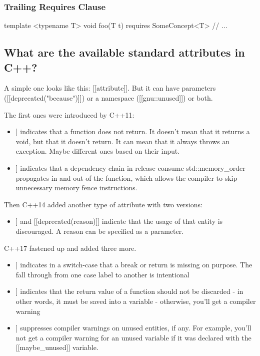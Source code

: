 \documentclass{report}
\begin{document}
\bigbreak \noindent 
\subsubsection{Trailing Requires Clause}
\bigbreak \noindent 
\begin{cppcode}
template <typename T>
void foo(T t) requires SomeConcept<T> {
    // ...
}
\end{cppcode}

\bigbreak \noindent 
\subsection{What are the available standard attributes in C++?}
\bigbreak \noindent 
A simple one looks like this: [[attribute]]. But it can have
parameters ([[deprecated("because")]]) or a namespace
([[gnu::unused]]) or both.

\bigbreak \noindent 
The first ones were introduced by C++11:
\begin{itemize}
    \item \relax [[noreturn]] indicates that a function does not return. It doesn’t mean that it returns a void, but that it doesn’t return. It can mean that it always throws an exception. Maybe different ones based on their input.
    \item  \relax [[carries\_dependency]] indicates that a dependency chain in release-consume std::memory\_order propagates in and out of the function, which allows the compiler to skip unnecessary memory fence instructions.
\end{itemize}

\bigbreak \noindent 
Then C++14 added another type of attribute with two versions:
\begin{itemize}
    \item \relax [[deprecated]] and [[deprecated(reason)]] indicate that the usage of that entity is discouraged. A reason can be specified as a parameter.
\end{itemize}
\bigbreak \noindent 
C++17 fastened up and added three more.
\begin{itemize}
    \item \relax [[fallthrough]] indicates in a switch-case that a break or return is missing on purpose. The fall through from one case label to another is intentional
    \item \relax [[nodiscard]] indicates that the return value of a function should not be discarded - in other words, it must be saved into a variable - otherwise, you’ll get a compiler warning
    \item \relax [[maybe\_unused]] suppresses compiler warnings on unused entities, if any. For example, you’ll not get a compiler warning for an unused variable if it was declared with the [[maybe\_unused]] variable.
\end{itemize}
\end{document}
